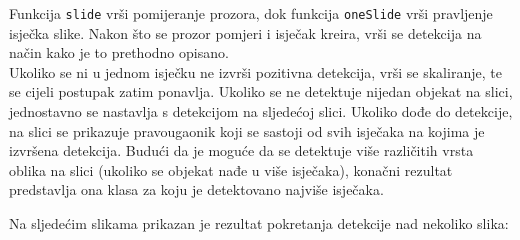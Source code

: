 \documentclass[12pt,a4paper]{article}
\begin{document}
Funkcija \texttt{slide} vrši pomijeranje prozora, dok funkcija \texttt{oneSlide} vrši pravljenje isječka slike. Nakon što se prozor pomjeri i isječak kreira, vrši se detekcija na način kako je to prethodno opisano.\\

Ukoliko se ni u jednom isječku ne izvrši pozitivna detekcija, vrši se skaliranje, te se cijeli postupak zatim ponavlja. Ukoliko se ne detektuje nijedan objekat na slici, jednostavno se nastavlja s detekcijom na sljedećoj slici. Ukoliko dođe do detekcije, na slici se prikazuje pravougaonik koji se sastoji od svih isječaka na kojima je izvršena detekcija. Budući da je moguće da se detektuje više različitih vrsta oblika na slici (ukoliko se objekat nađe u više isječaka), konačni rezultat predstavlja ona klasa za koju je detektovano najviše isječaka.\\

\newpage

Na sljedećim slikama prikazan je rezultat pokretanja detekcije nad nekoliko slika:
\end{document}
